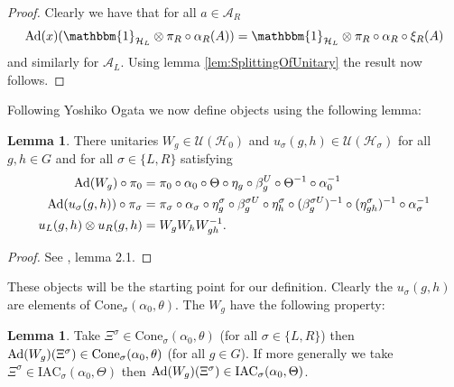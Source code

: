 \documentclass[12pt,a4paper,twoside]{article}
\newcommand{\IAC}{\textrm{IAC}}
\let\originalleft\left
\let\originalright\right
\renewcommand{\left}{\mathopen{}\mathclose\bgroup\originalleft}
\renewcommand{\right}{\aftergroup\egroup\originalright}
\newcommand{\UU}{\mathcal U}
\newcommand{\HH}{\mathcal H}
\renewcommand{\AA}{\mathcal A}
\newcommand{\id}{\mathbbm{1}}
\newcommand{\Ad}[1]{\textrm{Ad}\left(#1\right)}
\theoremstyle{definition}
\newtheorem{lemma}[theorem]{Lemma}
\numberwithin{equation}{section}
\begin{document}
\begin{proof}
	Clearly we have that for all $a\in\AA_R$
	\begin{equation}
		\Ad{x}(\id_{\HH_L}\otimes \pi_R\circ\alpha_R(A))=\id_{\HH_L}\otimes \pi_R\circ\alpha_R\circ\xi_R(A)
	\end{equation}
	and similarly for $\AA_L$. Using lemma \ref{lem:SplittingOfUnitary} the result now follows.
\end{proof}
Following Yoshiko Ogata \cite{ogata2021h3gmathbb} we now define objects using the following lemma:
\begin{lemma}\label{lem:Definition_W_And_u}
	There unitaries $W_g\in\UU(\HH_0)$ and $u_{\sigma}(g,h)\in\UU(\HH_{\sigma})$ for all $g,h\in G$ and for all $\sigma\in\{L,R\}$ satisfying
	\begin{align}
		\Ad{W_g}\circ\pi_0&=\pi_0\circ\alpha_0\circ\Theta\circ\eta_g\circ\beta_g^U\circ\Theta^{-1}\circ\alpha_0^{-1}\\
		\Ad{u_\sigma(g,h)}\circ\pi_\sigma&=\pi_\sigma\circ\alpha_\sigma\circ\eta_g^\sigma\circ\beta_g^{\sigma U}\circ\eta_h^{\sigma}\circ(\beta_g^{\sigma U})^{-1}\circ(\eta^\sigma_{gh})^{-1}\circ\alpha_\sigma^{-1}\\
		u_L(g,h)\otimes u_R(g,h)&=W_gW_hW_{gh}^{-1}.
	\end{align}
\end{lemma}
\begin{proof}
	See \cite{ogata2021h3gmathbb}, lemma 2.1.
\end{proof}
These objects will be the starting point for our definition. Clearly the $u_\sigma(g,h)$ are elements of $\textrm{Cone}_\sigma(\alpha_0,\theta)$. The $W_g$ have the following property:
\begin{lemma}\label{lem:AdjointOverConeIsInCone}
	Take $\Xi^{\sigma}\in\textrm{Cone}_\sigma(\alpha_0,\theta)$ (for all $\sigma\in\{L,R\}$) then $\Ad{W_g}(\Xi^\sigma)\in\textrm{Cone}_\sigma(\alpha_0,\theta)$ (for all $g\in G$).	If more generally we take $\Xi^\sigma\in\IAC_\sigma(\alpha_0,\Theta)$ then $\Ad{W_g}(\Xi^\sigma)\in\IAC_\sigma(\alpha_0,\Theta)$.
\end{lemma}
\end{document}
